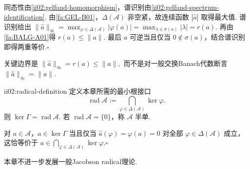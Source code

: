 \begin{FAProof}
同态性由\autoref{ii02:gelfand-homomorphism}，谱识别由\autoref{ii02:gelfand-spectrum-identification}. 由\autoref{fa:GEL-B01}，\(\displaystyle\Delta(\mathcal A)\) 非空紧，故连续函数 \(\displaystyle|\widehat a|\) 取得最大值. 谱识别给出
\(\displaystyle \|\widehat a\|_\infty = \max_{\varphi\in\Delta(\mathcal A)}|\varphi(a)| = \max_{\lambda\in\sigma(a)}|\lambda| = r(a).\)
再由\autoref{fa:BALG-A01}得 \(\displaystyle r(a)\leqslant\|a\|\). 最后 \(\displaystyle a\) 可逆当且仅当 \(\displaystyle0\notin\sigma(a)\)，结合谱识别即得两重等价.\hfill\(\square\)
\end{FAProof}

关键边界是
\(\displaystyle \|\widehat a\|_\infty=r(a)\leqslant\|a\|,\)
而不是对一般交换Banach代数断言 \(\displaystyle\|\widehat a\|_\infty=\|a\|\).

\begin{FADefinition}[C][Gelfand核与半单性]{ii02:radical-definition}
定义本章所需的最小根接口
\[
\operatorname{rad}\mathcal A
:=
\bigcap_{\varphi\in\Delta(\mathcal A)}\ker\varphi.
\]
则 \(\displaystyle\ker\Gamma=\operatorname{rad}\mathcal A\). 若 \(\displaystyle\operatorname{rad}\mathcal A=\{0\}\)，称 \(\displaystyle\mathcal A\) 半单.
\end{FADefinition}

\begin{FAProof}[等式证明]
对 \(\displaystyle a\in\mathcal A\)，\(\displaystyle a\in\ker\Gamma\) 当且仅当 \(\displaystyle\widehat a(\varphi)=\varphi(a)=0\) 对全部 \(\displaystyle\varphi\in\Delta(\mathcal A)\) 成立，这恰等价于 \(\displaystyle a\in\bigcap_{\varphi\in\Delta(\mathcal A)}\ker\varphi\).\hfill\(\square\)
\end{FAProof}

本章不进一步发展一般Jacobson radical理论.

